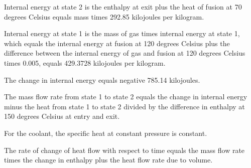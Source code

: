Internal energy at state 2 is the enthalpy at exit plus the heat of fusion at 70 degrees Celsius equals mass times 292.85 kilojoules per kilogram.

Internal energy at state 1 is the mass of gas times internal energy at state 1, which equals the internal energy at fusion at 120 degrees Celsius plus the difference between the internal energy of gas and fusion at 120 degrees Celsius times 0.005, equals 429.3728 kilojoules per kilogram.

The change in internal energy equals negative 785.14 kilojoules.

The mass flow rate from state 1 to state 2 equals the change in internal energy minus the heat from state 1 to state 2 divided by the difference in enthalpy at 150 degrees Celsius at entry and exit.

For the coolant, the specific heat at constant pressure is constant.

The rate of change of heat flow with respect to time equals the mass flow rate times the change in enthalpy plus the heat flow rate due to volume.